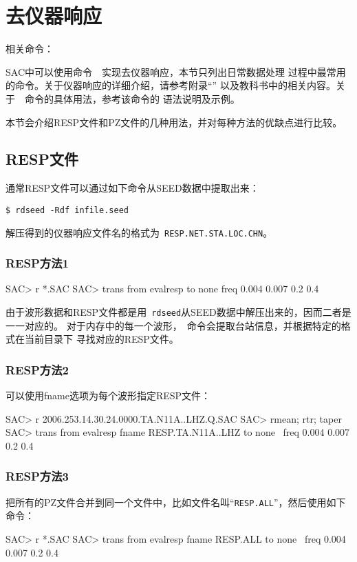 \section{去仪器响应}
\label{sec:instrument-response}
相关命令：

SAC中可以使用命令~~实现去仪器响应，本节只列出日常数据处理
过程中最常用的命令。关于仪器响应的详细介绍，请参考附录``''
以及教科书中的相关内容。关于~~命令的具体用法，参考该命令的
语法说明及示例。

本节会介绍RESP文件和PZ文件的几种用法，并对每种方法的优缺点进行比较。
\subsection{RESP文件}
通常RESP文件可以通过如下命令从SEED数据中提取出来：
\begin{verbatim}
$ rdseed -Rdf infile.seed
\end{verbatim}
解压得到的仪器响应文件名的格式为~\verb+RESP.NET.STA.LOC.CHN+。

\subsubsection{RESP方法1}
\begin{SACCode}
SAC> r *.SAC
SAC> trans from evalresp to none freq 0.004 0.007 0.2 0.4
\end{SACCode}
由于波形数据和RESP文件都是用~\verb+rdseed+从SEED数据中解压出来的，因而二者是一一对应的。
对于内存中的每一个波形，~命令会提取台站信息，并根据特定的格式在当前目录下
寻找对应的RESP文件。

\subsubsection{RESP方法2}
可以使用fname选项为每个波形指定RESP文件：
\begin{SACCode}
SAC> r 2006.253.14.30.24.0000.TA.N11A..LHZ.Q.SAC
SAC> rmean; rtr; taper
SAC> trans from evalresp fname RESP.TA.N11A..LHZ to none \
                                freq 0.004 0.007 0.2 0.4
\end{SACCode}

\subsubsection{RESP方法3}
把所有的PZ文件合并到同一个文件中，比如文件名叫``\verb+RESP.ALL+''，然后使用如下命令：
\begin{SACCode}
SAC> r *.SAC
SAC> trans from evalresp fname RESP.ALL to none \
                            freq 0.004 0.007 0.2 0.4
\end{SACCode}

